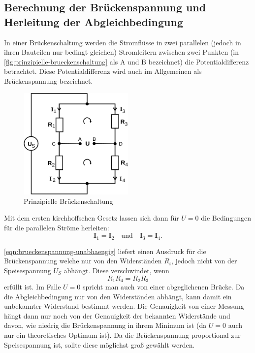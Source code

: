 \subsection{Berechnung der Brückenspannung und Herleitung der 
Abgleichbedingung}
\label{sec:abgleichbedingung}

In einer Brückenschaltung werden die Stromflüsse in zwei parallelen (jedoch in ihren
Bauteilen nur bedingt gleichen) Stromleitern zwischen zwei Punkten (in 
\autoref{fig:prinzipielle-brueckenschaltung} als A und B bezeichnet) die Potentialdifferenz 
betrachtet.
Diese Potentialdifferenz wird auch im Allgemeinen als Brückenspannung bezeichnet.

\begin{figure}[H]
	\centering
	\includegraphics[width=0.5\textwidth]{bilder/prinzipielle-brueckenschaltung.png}
	\caption{Prinzipielle Brückenschaltung}
	\label{fig:prinzipielle-brueckenschaltung}
\end{figure}

Mit dem ersten kirchhoffschen Gesetz lassen sich dann für $U=0$ die Bedingungen für
die parallelen Ströme herleiten:
\begin{equation}
	\mathbf{I}_1 = \mathbf{I}_2
	\quad \text{und} \quad
	\mathbf{I}_3 = \mathbf{I}_4.
	\label{eqn:brueckenschaltung-stroeme}
\end{equation}


\autoref{eqn:brueckenspannung-unabhaengig} liefert einen Ausdruck für die Brückenspannung
welche nur von den Widerständen $R_i$, jedoch nicht von der Speisespannung $U_S$ abhängt.
Diese verschwindet, wenn
\begin{equation}
	R_1R_4 = R_2R_3
	\label{eqn:prinzipielle-abgleichbedingung}
\end{equation}
erfüllt ist. Im Falle $U=0$ spricht man auch von einer abgeglichenen Brücke. Da die 
Abgleichbedingung nur von den Widerständen abhängt, kann damit ein unbekannter Widerstand
bestimmt werden. Die Genauigkeit von einer Messung hängt dann nur noch von der Genauigkeit
der bekannten Widerstände und davon, wie niedrig die Brückenspannung in ihrem Minimum ist
(da $U=0$ auch nur ein theoretisches Optimum ist).
Da die Brückenspannung proportional zur Speisespannung ist, sollte diese möglichst
groß gewählt werden.

